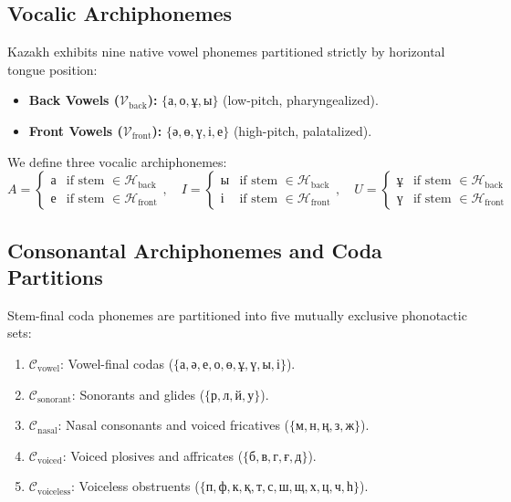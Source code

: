 \subsection{Vocalic Archiphonemes}
Kazakh exhibits nine native vowel phonemes partitioned strictly by horizontal tongue position:
\begin{itemize}
    \item \textbf{Back Vowels ($\mathcal{V}_{\text{back}}$):} $\{\text{а}, \text{о}, \text{ұ}, \text{ы}\}$ (low-pitch, pharyngealized).
    \item \textbf{Front Vowels ($\mathcal{V}_{\text{front}}$):} $\{\text{ә}, \text{ө}, \text{ү}, \text{і}, \text{е}\}$ (high-pitch, palatalized).
\end{itemize}
We define three vocalic archiphonemes:
\begin{equation}
\label{eq:vocalic_archiphonemes}
A = \begin{cases} \text{а} & \text{if stem } \in \mathcal{H}_{\text{back}} \\ \text{е} & \text{if stem } \in \mathcal{H}_{\text{front}} \end{cases}, \quad
I = \begin{cases} \text{ы} & \text{if stem } \in \mathcal{H}_{\text{back}} \\ \text{і} & \text{if stem } \in \mathcal{H}_{\text{front}} \end{cases}, \quad
U = \begin{cases} \text{ұ} & \text{if stem } \in \mathcal{H}_{\text{back}} \\ \text{ү} & \text{if stem } \in \mathcal{H}_{\text{front}} \end{cases}
\end{equation}

\subsection{Consonantal Archiphonemes and Coda Partitions}
Stem-final coda phonemes are partitioned into five mutually exclusive phonotactic sets:
\begin{enumerate}
    \item $\mathcal{C}_{\text{vowel}}$: Vowel-final codas ($\{\text{а}, \text{ә}, \text{е}, \text{о}, \text{ө}, \text{ұ}, \text{ү}, \text{ы}, \text{і}\}$).
    \item $\mathcal{C}_{\text{sonorant}}$: Sonorants and glides ($\{\text{р}, \text{л}, \text{й}, \text{у}\}$).
    \item $\mathcal{C}_{\text{nasal}}$: Nasal consonants and voiced fricatives ($\{\text{м}, \text{н}, \text{ң}, \text{з}, \text{ж}\}$).
    \item $\mathcal{C}_{\text{voiced}}$: Voiced plosives and affricates ($\{\text{б}, \text{в}, \text{г}, \text{ғ}, \text{д}\}$).
    \item $\mathcal{C}_{\text{voiceless}}$: Voiceless obstruents ($\{\text{п}, \text{ф}, \text{к}, \text{қ}, \text{т}, \text{с}, \text{ш}, \text{щ}, \text{х}, \text{ц}, \text{ч}, \text{һ}\}$).
\end{enumerate}

